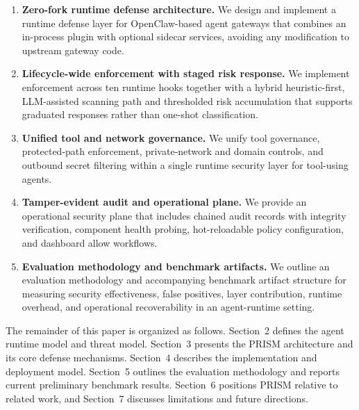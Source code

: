\begin{enumerate}[leftmargin=1.5em]
  \item \textbf{Zero-fork runtime defense architecture.} We design and implement a runtime defense layer for OpenClaw-based agent gateways that combines an in-process plugin with optional sidecar services, avoiding any modification to upstream gateway code.
  \item \textbf{Lifecycle-wide enforcement with staged risk response.} We implement enforcement across ten runtime hooks together with a hybrid heuristic-first, LLM-assisted scanning path and thresholded risk accumulation that supports graduated responses rather than one-shot classification.
  \item \textbf{Unified tool and network governance.} We unify tool governance, protected-path enforcement, private-network and domain controls, and outbound secret filtering within a single runtime security layer for tool-using agents.
  \item \textbf{Tamper-evident audit and operational plane.} We provide an operational security plane that includes chained audit records with integrity verification, component health probing, hot-reloadable policy configuration, and dashboard allow workflows.
  \item \textbf{Evaluation methodology and benchmark artifacts.} We outline an evaluation methodology and accompanying benchmark artifact structure for measuring security effectiveness, false positives, layer contribution, runtime overhead, and operational recoverability in an agent-runtime setting.
\end{enumerate}

The remainder of this paper is organized as follows. Section~2 defines the agent runtime model and threat model. Section~3 presents the PRISM architecture and its core defense mechanisms. Section~4 describes the implementation and deployment model. Section~5 outlines the evaluation methodology and reports current preliminary benchmark results. Section~6 positions PRISM relative to related work, and Section~7 discusses limitations and future directions.
